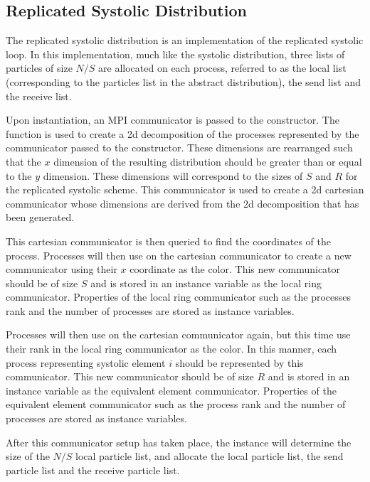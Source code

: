 \subsection{Replicated Systolic Distribution}

The replicated systolic distribution is an implementation of the
replicated systolic loop.
%
In this implementation, much like the systolic distribution,
three lists of particles of size $N/S$ are allocated on each process,
referred to as the local list (corresponding to the particles list
in the abstract distribution), the send list and the receive list.

Upon instantiation, an MPI communicator is passed to the constructor.
%
The \mpidimscreate{} function is used to create a 2d decomposition
of the processes represented by the communicator passed to the
constructor.
%
These dimensions are rearranged such that the $x$ dimension of the
resulting distribution should be greater than or equal to the $y$
dimension.
%
These dimensions will correspond to the sizes of $S$ and $R$ for
the replicated systolic scheme.
%
This communicator is used to create a 2d cartesian communicator whose
dimensions are derived from the 2d decomposition that has been generated.

This cartesian communicator is then queried to find the coordinates of
the process.
%
Processes will then use \mpicommsplit{} on the cartesian communicator
to create a new communicator using their $x$ coordinate as the color.
%
This new communicator should be of size $S$ and
is stored in an instance variable as the local ring communicator.
%
Properties of the local ring communicator such as the processes rank
and the number of processes are stored as instance variables.

Processes will then use \mpicommsplit{} on the cartesian communicator
again, but this time use their rank in the local ring communicator as
the color.
%
In this manner, each process representing systolic element $i$ should
be represented by this communicator.
%
This new communicator should be of size $R$ and is stored in an instance
variable as the equivalent element communicator.
%
Properties of the equivalent element communicator such as the process rank
and the number of processes are stored as instance variables.

After this communicator setup has taken place, the instance will determine
the size of the $N/S$ local particle list, and allocate the local particle
list, the send particle list and the receive particle list.

